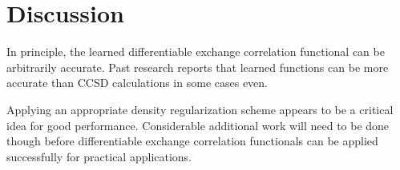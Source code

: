 \documentclass[book.tex]{subfiles}
\begin{document}


\section{Discussion}
In principle, the learned differentiable exchange correlation functional can be arbitrarily accurate. Past research reports that learned functions can be more accurate than CCSD calculations in some cases even. %

Applying an appropriate density regularization scheme appears to be a critical idea for good performance. Considerable additional work will need to be done though before differentiable exchange correlation functionals can be applied successfully for practical applications.


\end{document}
